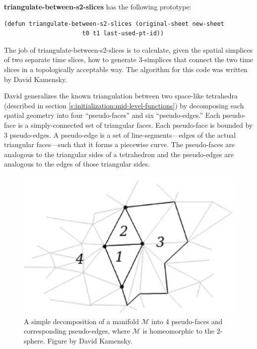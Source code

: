 \documentclass[12pt]{article}
\begin{document}
\textbf{triangulate-between-s2-slices} has the following prototype:
\begin{lstlisting}
(defun triangulate-between-s2-slices (original-sheet new-sheet 
				      t0 t1 last-used-pt-id))
\end{lstlisting}

The job of triangulate-between-s2-slices is to calculate, given the
spatial simplices of two separate time slices, how to generate
3-simplices that connect the two time slices in a topologically
acceptable way. The algorithm for this code was written by David
Kamensky. 

David generalizes the known triangulation between two space-like
tetrahedra (described in section
\ref{s:initialization:mid-level-functions}) by decomposing each
spatial geometry into four ``pseudo-faces'' and six ``pseudo-edges.''
Each pseudo-face is a simply-connected set of triangular faces. Each
pseudo-face is bounded by 3 pseudo-edges. A pseudo-edge is a set of
line-segments---edges of the actual triangular faces---such that it
forms a piecewise curve. The pseudo-faces are analogous to the
triangular sides of a tetrahedron and the pseudo-edges are analogous
to the edges of those triangular sides.

\begin{figure}[htb]
\begin{center}
\leavevmode
\includegraphics[width=\textwidth]{pseudo-face_pseudo-edge_decomposition.png}
\caption{A simple decomposition of a manifold $\mathcal{M}$ into 4
  pseudo-faces and corresponding pseudo-edges, where $\mathcal{M}$ is
  homeomorphic to the 2-sphere. Figure by David Kamensky.}
\label{fig:pseudo-face-decomposition}
\end{center}
\end{figure}
\end{document}
